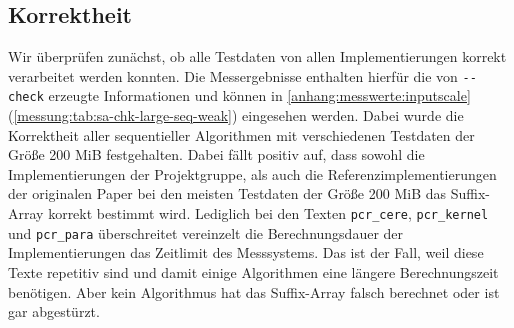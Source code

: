 \subsection{\sa Korrektheit}

Wir überprüfen zunächst, ob alle Testdaten von allen Implementierungen korrekt verarbeitet werden konnten. Die Messergebnisse enthalten hierfür die von \texttt{-{}-check} erzeugte Informationen und können in \cref{anhang:messwerte:inputscale} (\cref{messung:tab:sa-chk-large-seq-weak}) eingesehen werden. Dabei wurde die Korrektheit aller sequentieller Algorithmen mit verschiedenen Testdaten der Größe 200 MiB festgehalten. Dabei fällt positiv auf, dass sowohl die Implementierungen der Projektgruppe, als auch die Referenzimplementierungen der originalen Paper bei den meisten Testdaten der Größe 200 MiB das Suffix-Array korrekt bestimmt wird. Lediglich bei den Texten \texttt{pcr\_cere}, \texttt{pcr\_kernel} und \texttt{pcr\_para} überschreitet vereinzelt die Berechnungsdauer der Implementierungen das Zeitlimit des Messsystems. Das ist der Fall, weil diese Texte repetitiv sind und damit einige Algorithmen eine längere Berechnungszeit benötigen. Aber kein Algorithmus hat das Suffix-Array falsch berechnet oder ist gar abgestürzt.